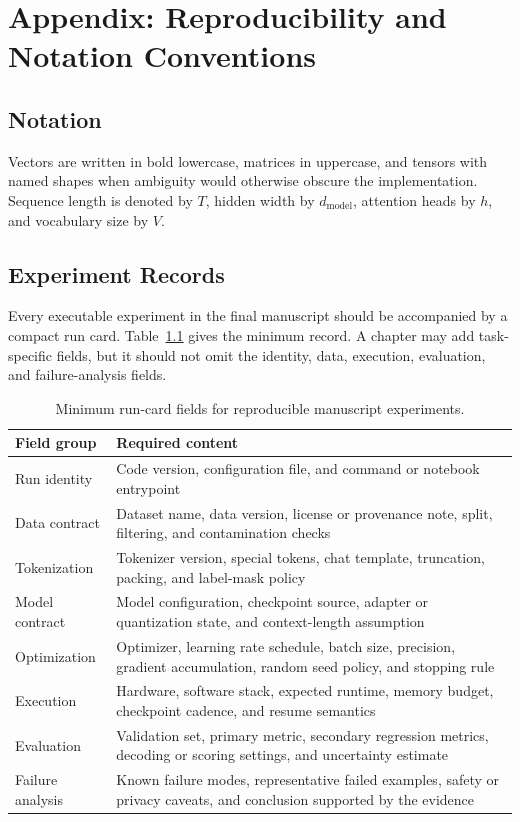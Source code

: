 \chapter{Appendix: Reproducibility and Notation Conventions}
\label{app:reproducibility}

\section{Notation}
Vectors are written in bold lowercase, matrices in uppercase, and tensors with named shapes when ambiguity would otherwise obscure the implementation. Sequence length is denoted by $T$, hidden width by $d_{\mathrm{model}}$, attention heads by $h$, and vocabulary size by $V$.

\section{Experiment Records}
Every executable experiment in the final manuscript should be accompanied by a compact run card. Table~\ref{tab:run-card-template} gives the minimum record. A chapter may add task-specific fields, but it should not omit the identity, data, execution, evaluation, and failure-analysis fields.

\begin{table}
\caption{Minimum run-card fields for reproducible manuscript experiments.}\label{tab:run-card-template}
\begin{tabular}{p{}p{}}
\toprule
Field group & Required content \\
\midrule
Run identity & Code version, configuration file, and command or notebook entrypoint \\
Data contract & Dataset name, data version, license or provenance note, split, filtering, and contamination checks \\
Tokenization & Tokenizer version, special tokens, chat template, truncation, packing, and label-mask policy \\
Model contract & Model configuration, checkpoint source, adapter or quantization state, and context-length assumption \\
Optimization & Optimizer, learning rate schedule, batch size, precision, gradient accumulation, random seed policy, and stopping rule \\
Execution & Hardware, software stack, expected runtime, memory budget, checkpoint cadence, and resume semantics \\
Evaluation & Validation set, primary metric, secondary regression metrics, decoding or scoring settings, and uncertainty estimate \\
Failure analysis & Known failure modes, representative failed examples, safety or privacy caveats, and conclusion supported by the evidence \\
\bottomrule
\end{tabular}
\end{table}

